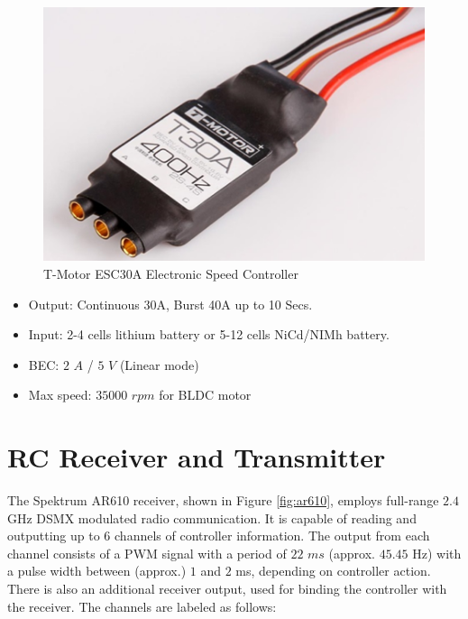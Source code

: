 \documentclass[a4paper]{report}
\begin{document}
\begin{figure}[h]
    \centering
    \includegraphics[scale=0.8]{images/esc_tmotor.png}
    \caption{T-Motor ESC30A Electronic Speed Controller}
    \label{fig:esc_tmotor}
\end{figure}

\begin{itemize}
  \item Output: Continuous 30A, Burst 40A up to 10 Secs.
  \item Input: 2-4 cells lithium battery or 5-12 cells NiCd/NIMh battery.
  \item BEC: $2$ $A$ / $5$ $V$ (Linear mode)
  \item Max speed: $35000$ $rpm$ for BLDC motor
\end{itemize}

	\section{RC Receiver and Transmitter}

The Spektrum AR610 receiver, shown in Figure \ref{fig:ar610}, employs full-range $2.4$ GHz DSMX modulated radio communication. It is capable of reading and outputting up to 6 channels of controller information. The output from each channel consists of a PWM signal with a period of $22$ $ms$ (approx. $45.45$ Hz) with a pulse width between (approx.) $1$ and $2$ ms, depending on controller action. There is also an additional receiver output, used for binding the controller with the receiver. The channels are labeled as follows:
\end{document}
